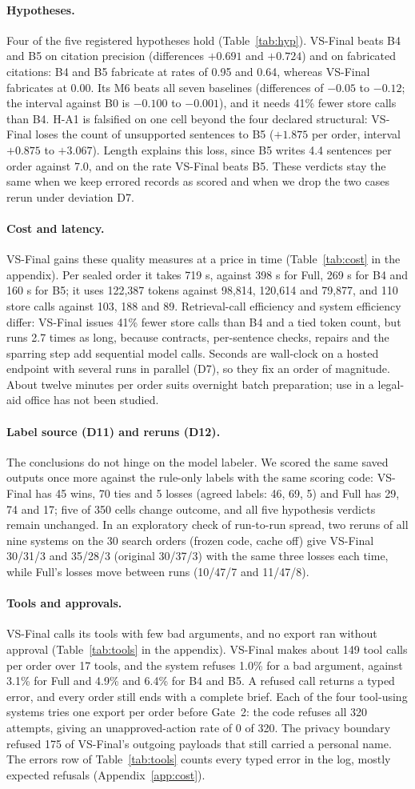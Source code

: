 \documentclass[11pt]{article}
\let\vsaddcontentsline\addcontentsline
\let\addcontentsline\vsaddcontentsline
\newcommand{\vs}{VS-Final}
\def\vsstrip#1.\vsend{#1}
\newcommand{\para}[1]{\paragraph{#1}\addcontentsline{toc}{subsection}{\vsstrip#1\vsend}}
\begin{document}
\para{Hypotheses.} Four of the five registered hypotheses hold (Table~\ref{tab:hyp}). \vs{} beats B4 and B5 on citation precision (differences $+0.691$ and $+0.724$) and on fabricated citations: B4 and B5 fabricate at rates of 0.95 and 0.64, whereas \vs{} fabricates at 0.00. Its M6 beats all seven baselines (differences of $-0.05$ to $-0.12$; the interval against B0 is $-0.100$ to $-0.001$), and it needs 41\% fewer store calls than B4. H-A1 is falsified on one cell beyond the four declared structural: \vs{} loses the count of unsupported sentences to B5 ($+1.875$ per order, interval $+0.875$ to $+3.067$). Length explains this loss, since B5 writes 4.4 sentences per order against 7.0, and on the rate \vs{} beats B5. These verdicts stay the same when we keep errored records as scored and when we drop the two cases rerun under deviation D7.

\para{Cost and latency.} \vs{} gains these quality measures at a price in time (Table~\ref{tab:cost} in the appendix). Per sealed order it takes 719 s, against 398 s for Full, 269 s for B4 and 160 s for B5; it uses 122,387 tokens against 98,814, 120,614 and 79,877, and 110 store calls against 103, 188 and 89. Retrieval-call efficiency and system efficiency differ: \vs{} issues 41\% fewer store calls than B4 and a tied token count, but runs 2.7 times as long, because contracts, per-sentence checks, repairs and the sparring step add sequential model calls. Seconds are wall-clock on a hosted endpoint with several runs in parallel (D7), so they fix an order of magnitude. About twelve minutes per order suits overnight batch preparation; use in a legal-aid office has not been studied.

\para{Label source (D11) and reruns (D12).} The conclusions do not hinge on the model labeler. We scored the same saved outputs once more against the rule-only labels with the same scoring code: \vs{} has 45 wins, 70 ties and 5 losses (agreed labels: 46, 69, 5) and Full has 29, 74 and 17; five of 350 cells change outcome, and all five hypothesis verdicts remain unchanged. In an exploratory check of run-to-run spread, two reruns of all nine systems on the 30 search orders (frozen code, cache off) give \vs{} 30/31/3 and 35/28/3 (original 30/37/3) with the same three losses each time, while Full's losses move between runs (10/47/7 and 11/47/8).

\para{Tools and approvals.} \vs{} calls its tools with few bad arguments, and no export ran without approval (Table~\ref{tab:tools} in the appendix). \vs{} makes about 149 tool calls per order over 17 tools, and the system refuses 1.0\% for a bad argument, against 3.1\% for Full and 4.9\% and 6.4\% for B4 and B5. A refused call returns a typed error, and every order still ends with a complete brief. Each of the four tool-using systems tries one export per order before Gate~2: the code refuses all 320 attempts, giving an unapproved-action rate of 0 of 320. The privacy boundary refused 175 of \vs{}'s outgoing payloads that still carried a personal name. The errors row of Table~\ref{tab:tools} counts every typed error in the log, mostly expected refusals (Appendix~\ref{app:cost}).
\end{document}
